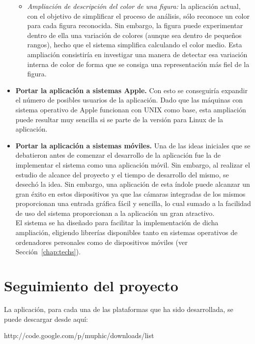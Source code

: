 \begin{itemize}
\begin{itemize}
		\item\textit{Ampliación de descripción del color de una figura:} la aplicación actual, con el objetivo de simplificar el proceso de análisis, sólo reconoce un color para cada figura reconocida. Sin embargo, la figura puede experimentar dentro de ella una variación de colores (aunque sea dentro de pequeños rangos), hecho que el sistema simplifica calculando el color medio. Esta ampliación consistiría en investigar una manera de detectar esa variación interna de color de forma que se consiga una representación más fiel de la figura.
	\end{itemize}

\item\textbf{Portar la aplicación a sistemas Apple.} Con esto se conseguiría expandir el número de posibles usuarios de la aplicación. Dado que las máquinas con sistema operativo de Apple funcionan con UNIX como base, esta ampliación puede resultar muy sencilla si se parte de la versión para Linux de la aplicación.

\item\textbf{Portar la aplicación a sistemas móviles.} Una de las ideas iniciales que se debatieron antes de comenzar el desarrollo de la aplicación fue la de implementar el sistema como una aplicación móvil. Sin embargo, al realizar el estudio de alcance del proyecto y el tiempo de desarrollo del mismo, se desechó la idea. Sin embargo, una aplicación de esta índole puede alcanzar un gran éxito en estos dispositivos ya que las cámaras integradas de los mismos proporcionan una entrada gráfica fácil y sencilla, lo cual sumado a la facilidad de uso del sistema proporcionan a la aplicación un gran atractivo.\\ 

El sistema se ha diseñado para facilitar la implementación de dicha ampliación, eligiendo librerías disponibles tanto en sistemas operativos de ordenadores personales como de dispositivos móviles (ver Sección~\ref{chap:techs}).\\

\end{itemize}


\section{Seguimiento del proyecto}

La aplicación, para cada una de las plataformas que ha sido desarrollada, se puede descargar desde aquí:

\begin{center}
http://code.google.com/p/muphic/downloads/list
\end{center}

